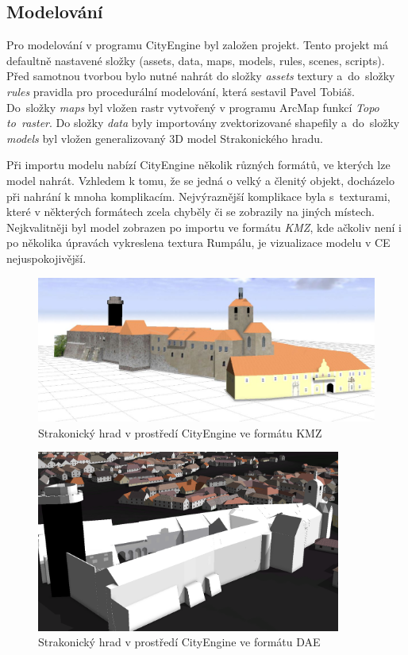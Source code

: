 \documentclass[thesis=M,czech]{FITthesis}[2012/06/26]
\begin{document}
\subsection{Modelování}
Pro modelování v programu CityEngine byl založen projekt. Tento projekt má defaultně nastavené složky (assets, data, maps, models, rules, scenes, scripts). Před samotnou tvorbou bylo nutné nahrát do složky \textit{assets} textury a~do~složky \textit{rules} pravidla pro procedurální modelování, která sestavil Pavel Tobiáš. Do~složky \textit{maps} byl vložen rastr vytvořený v programu ArcMap funkcí \textit{Topo to~raster}. Do složky \textit{data} byly importovány zvektorizované shapefily a~do~složky \textit{models} byl vložen generalizovaný 3D model Strakonického hradu.

Při importu modelu nabízí CityEngine několik různých formátů, ve kterých lze model nahrát. Vzhledem k tomu, že se jedná o velký a členitý objekt, docházelo při nahrání k mnoha komplikacím. Nejvýraznější komplikace byla s~texturami, které v některých formátech zcela chyběly či se zobrazily na jiných místech. Nejkvalitněji byl model zobrazen po importu ve formátu \textit{KMZ}, kde ačkoliv není i po několika úpravách vykreslena textura Rumpálu, je vizualizace modelu v CE nejuspokojivější. 

\begin{figure}[h]
	\centering
	\includegraphics[width=13cm]{pics/hrad_ce.jpg}
	\caption{Strakonický hrad v prostředí CityEngine ve formátu KMZ}
	\label{obrazek:hradCE}
\end{figure}

\begin{figure}[h]
	\centering
	\includegraphics[width=10cm]{pics/dae.png}
	\caption{Strakonický hrad v prostředí CityEngine ve formátu DAE}
	\label{obrazek:hraddae}
\end{figure}
\end{document}
